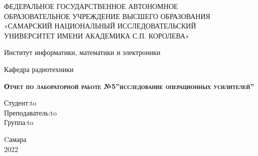 \begin{titlepage}
\newpage

\begin{center}\large
ФЕДЕРАЛЬНОЕ ГОСУДАРСТВЕННОЕ АВТОНОМНОЕ\\
ОБРАЗОВАТЕЛЬНОЕ УЧРЕЖДЕНИЕ ВЫСШЕГО ОБРАЗОВАНИЯ\\
«САМАРСКИЙ НАЦИОНАЛЬНЫЙ ИССЛЕДОВАТЕЛЬСКИЙ\\
УНИВЕРСИТЕТ ИМЕНИ АКАДЕМИКА С.П. КОРОЛЕВА»	
 \\
\end{center}

\vspace{8em}

\begin{center}
 Институт информатики, математики и электроники
 \\ 
\end{center}

\begin{center}
Кафедра радиотехники \\ 
\end{center}


\vspace{3em}

\begin{center}
\textsc{\textbf{Отчет по лабораторной работе №5\linebreak ''исследование операционных усилителей''}}
\end{center}

\vspace{20em}



\newbox{\lbox}
\newlength{\maxl}
\setlength{\maxl}{\wd\lbox}
\hfill\parbox{5cm}{
\hspace*{5cm}\hspace*{-5cm}Студент:\hfill\hbox to\\
\hspace*{5cm}\hspace*{-5cm}Преподаватель:\hfill\hbox to\\
\hspace*{5cm}\hspace*{-5cm}Группа:\hfill\hbox to\\
}


\vspace{\fill}

\begin{center}
Cамара \\2022
\end{center}

\end{titlepage}